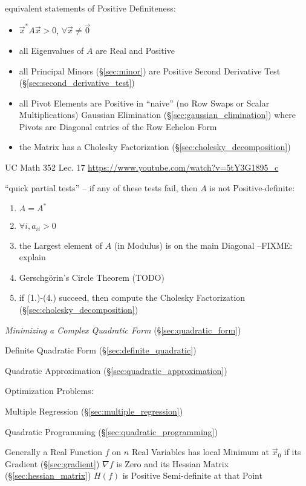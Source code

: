 equivalent statements of Positive Definiteness:
\begin{itemize}
  \item $\vec{x}^*A\vec{x} > 0$, $\forall \vec{x} \neq \vec{0}$
  \item all Eigenvalues of $A$ are Real and Positive
  \item all Principal Minors (\S\ref{sec:minor}) are Positive \fist Second
    Derivative Test (\S\ref{sec:second_derivative_test})
  \item all Pivot Elements are Positive in ``naive'' (no Row Swaps or Scalar
    Multiplications) Gaussian Elimination (\S\ref{sec:gaussian_elimination})
    where Pivots are Diagonal entries of the Row Echelon Form
  \item the Matrix has a Cholesky Factorization
    (\S\ref{sec:cholesky_decomposition})
\end{itemize}

UC Math 352 Lec. 17 \url{https://www.youtube.com/watch?v=5tY3G1895_c}

``quick partial tests'' -- if any of these tests fail, then $A$ is not
Positive-definite:
\begin{enumerate}
  \item $A = A^*$
  \item $\forall{i}, a_{ii} > 0$
  \item the Largest element of $A$ (in Modulus) is on the main Diagonal
    --FIXME: explain
  \item Gerschg\"orin's Circle Theorem (TODO)
  \item if (1.)-(4.) succeed, then compute the Cholesky Factorization
    (\S\ref{sec:cholesky_decomposition})
\end{enumerate}

\emph{Minimizing a Complex Quadratic Form} (\S\ref{sec:quadratic_form})

\fist Definite Quadratic Form (\S\ref{sec:definite_quadratic})

\fist Quadratic Approximation (\S\ref{sec:quadratic_approximation})

Optimization Problems:

\fist Multiple Regression (\S\ref{sec:multiple_regression})

\fist Quadratic Programming (\S\ref{sec:quadratic_programming})

Generally a Real Function $f$ on $n$ Real Variables has local Minimum at
$\vec{x}_0$ if its Gradient (\S\ref{sec:gradient}) $\nabla f$ is Zero and its
Hessian Matrix (\S\ref{sec:hessian_matrix}) $H(f)$ is Positive Semi-definite at
that Point

